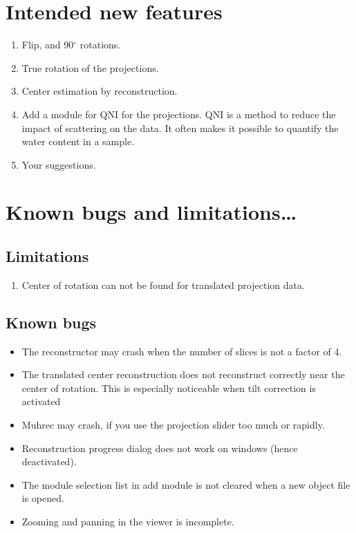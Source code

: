 \documentclass[a4paper]{scrreprt}
\begin{document}
\chapter{Intended new features}
\begin{enumerate}
\item Flip, and 90$^{\circ}$ rotations.
\item True rotation of the projections.
\item Center estimation by reconstruction.
\item Add a module for QNI for the projections. QNI is a method to reduce the impact of scattering on the data. It often makes it possible to quantify the water content in a sample.
\item Your suggestions.
\end{enumerate}

\chapter{Known bugs and limitations\ldots}
\section{Limitations}
\begin{enumerate}
\item Center of rotation can not be found for translated projection data.
\end{enumerate}
\section{Known bugs}
\begin{itemize}
\item The reconstructor may crash when the number of slices is not a factor of 4. 
\item The translated center reconstruction does not reconstruct correctly near the center of rotation.
This is especially noticeable when tilt correction is activated
\item Muhrec may crash, if you use the projection slider too much or rapidly.
\item Reconstruction progress dialog does not work on windows (hence deactivated).
\item The module selection list in add module is not cleared when a new object file is opened.
\item Zooming and panning in the viewer is incomplete.
\end{itemize}
\end{document}
